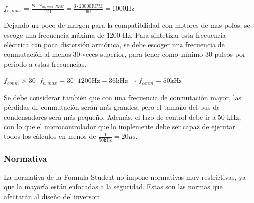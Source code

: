 \(f_{e,max} = \frac{pp\cdot \omega_{m, max, RPM}}{120} = \frac{3\cdot 20000 \text{RPM}}{60} = 1000 \text{Hz}\)

Dejando un poco de margen para la compatibilidad con motores de más polos, se escoge una frecuencia máxima de 1200 Hz. Para sintetizar esta frecuencia eléctrica con poca distorsión armónica, se debe escoger una frecuencia de conmutación al menos 30 veces superior, para tener como mínimo 30 pulsos por periodo a estas frecuencias.

\(f_{conm} > 30\cdot f_{e,max} = 30\cdot1200 \text{Hz} = 36 \text{kHz} \rightarrow f_{conm} = 50 \text{kHz}\)

Se debe considerar también que con una frecuencia de conmutación mayor, las pérdidas de conmutación serán más grandes, pero el tamaño del bus de condensadores será más pequeño. Además, el lazo de control debe ir a 50 kHz, con lo que el microcontrolador que lo implemente debe ser capaz de ejecutar todos los cálculos en menos de $\frac{1}{50 \text{kHz}} = 20 \mu\text{s}$.

\subsubsection{Normativa}
La normativa de la Formula Student no impone normativas muy restrictivas, ya que la mayoría están enfocadas a la seguridad. Estas son las normas que afectarán al diseño del inversor:

